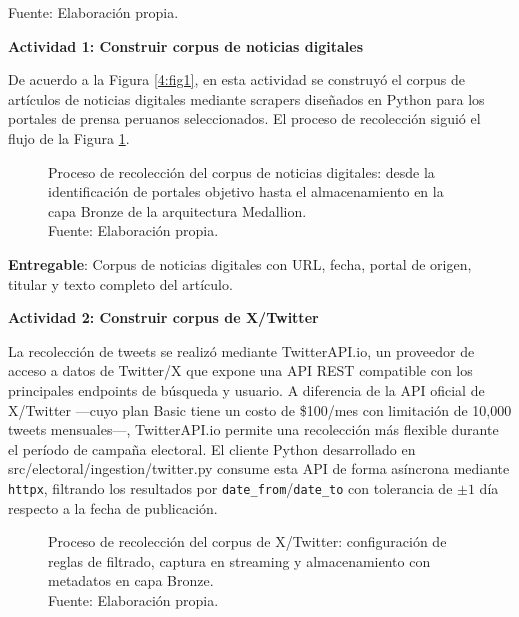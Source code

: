 \endgroup
\begin{flushleft}
    \small Fuente: Elaboración propia.
\end{flushleft}
 
\textbf{Actividad 1: Construir corpus de noticias digitales}
 
De acuerdo a la Figura \ref{4:fig1}, en esta actividad se construyó el corpus de artículos de noticias digitales mediante scrapers diseñados en Python para los portales de prensa peruanos seleccionados. El proceso de recolección siguió el flujo de la Figura \ref{4:fig4}.
 
\begin{figure}[!ht]
    \begin{center}
        \resizebox{0.85\textwidth}{!}{}
        \caption[Proceso de recolección del corpus de noticias digitales]{Proceso de recolección del corpus de noticias digitales: desde la identificación de portales objetivo hasta el almacenamiento en la capa Bronze de la arquitectura Medallion.\\
            Fuente: Elaboración propia.}
        \label{4:fig4}
    \end{center}
\end{figure}
 
\textbf{Entregable}: Corpus de noticias digitales con URL, fecha, portal de origen, titular y texto completo del artículo.
 
\textbf{Actividad 2: Construir corpus de X/Twitter}
 
La recolección de tweets se realizó mediante TwitterAPI.io, un proveedor de acceso a datos de Twitter/X que expone una API REST compatible con los principales endpoints de búsqueda y usuario. A diferencia de la API oficial de X/Twitter —cuyo plan Basic tiene un costo de \$100/mes con limitación de 10,000 tweets mensuales—, TwitterAPI.io permite una recolección más flexible durante el período de campaña electoral. El cliente Python desarrollado en src/electoral/ingestion/twitter.py consume esta API de forma asíncrona mediante \texttt{httpx}, filtrando los resultados por \texttt{date\_from}/\texttt{date\_to} con tolerancia de $\pm1$ día respecto a la fecha de publicación.

\begin{figure}[!ht]
    \begin{center}
        \resizebox{0.55\textwidth}{!}{}
        \caption[Proceso de recolección del corpus de X/Twitter mediante API Filtered Stream]{Proceso de recolección del corpus de X/Twitter: configuración de reglas de filtrado, captura en streaming y almacenamiento con metadatos en capa Bronze.\\
            Fuente: Elaboración propia.}
        \label{4:fig5}
    \end{center}
\end{figure}
 
